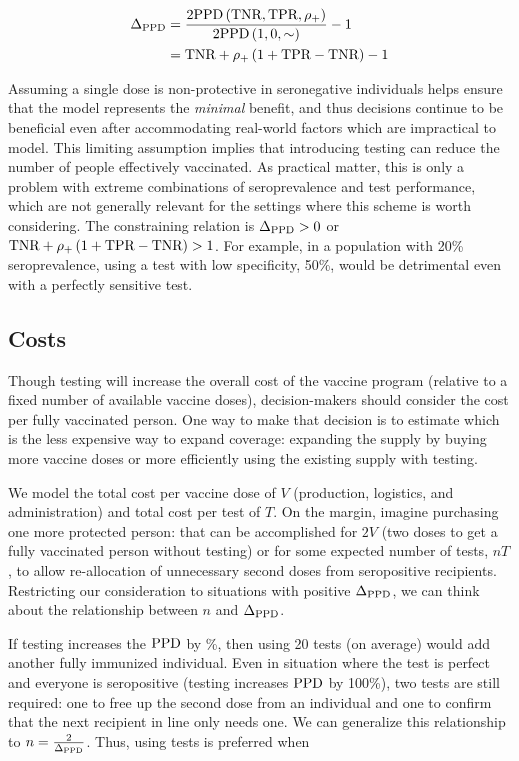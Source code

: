 \documentclass[10pt,a4paper,twocolumn]{article}
\begin{document}
\begin{equation}\label{delppd}
\begin{aligned}
\Delta_{\textrm{PPD}} &= \frac{2\textrm{PPD}\left(\textrm{TNR},\textrm{TPR},\rho_{{+}}\right)}{2\textrm{PPD}\left(1,0,\sim\right)} - 1 \\
&= \textrm{TNR} + \rho_{{+}} \left(1 + \textrm{TPR}-\textrm{TNR}\right) - 1
\end{aligned}
\end{equation}

Assuming a single dose is non-protective in seronegative individuals helps ensure that the model represents the {\em minimal} benefit, and thus decisions continue to be beneficial even after accommodating real-world factors which are impractical to model. This limiting assumption implies that introducing testing can reduce the number of people effectively vaccinated. As practical matter, this is only a problem with extreme combinations of seroprevalence and test performance, which are not generally relevant for the settings where this scheme is worth considering. The constraining relation is $\Delta_{\textrm{PPD}} > 0$ or $\textrm{TNR} + \rho_{{+}} \left(1 + \textrm{TPR}-\textrm{TNR}\right) > 1$. For example, in a population with 20\% seroprevalence, using a test with low specificity, 50\%, would be detrimental even with a perfectly sensitive test.

\subsection*{Costs}

Though testing will increase the overall cost of the vaccine program (relative to a fixed number of available vaccine doses), decision-makers should consider the cost per fully vaccinated person. One way to make that decision is to estimate which is the less expensive way to expand coverage: expanding the supply by buying more vaccine doses or more efficiently using the existing supply with testing.

We model the total cost per vaccine dose of $V$ (\ie* production, logistics, and administration) and total cost per test of $T$. On the margin, imagine purchasing one more protected person: that can be accomplished for $2V$ (\ie* two doses to get a fully vaccinated person without testing) or for some expected number of tests, $nT$, to allow re-allocation of unnecessary second doses from seropositive recipients. Restricting our consideration to situations with positive $\Delta_{\textrm{PPD}}$, we can think about the relationship between $n$ and $\Delta_{\textrm{PPD}}$.

If testing increases the $\textrm{PPD}$ by \%, then using 20 tests (on average) would add another fully immunized individual. Even in situation where the test is perfect and everyone is seropositive (\ie* testing increases $\textrm{PPD}$ by 100\%), two tests are still required: one to free up the second dose from an individual and one to confirm that the next recipient in line only needs one. We can generalize this relationship to $n = \frac{2}{\Delta_{\textrm{PPD}}}$. Thus, using tests is preferred when
\end{document}
